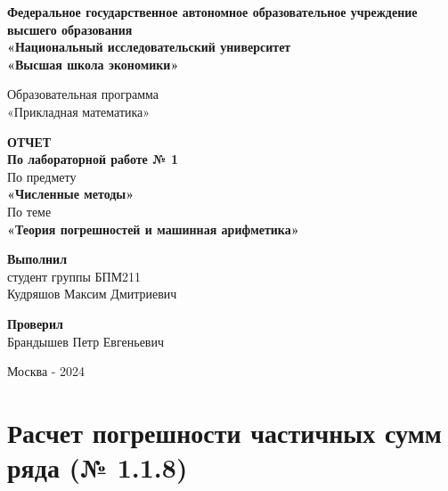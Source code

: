 \documentclass[a4paper,11pt]{article}
\theoremstyle{definition} %
\theoremstyle{remark} %
\begin{document}
\begin{titlepage} %
\pagestyle{empty}
\begin{center}

\Large
\textbf{Федеральное государственное автономное образовательное учреждение высшего образования\\
«Национальный исследовательский университет\\
«Высшая школа экономики»}\\
\vspace{5mm}

\Large
Образовательная программа \\
«Прикладная математика»
\vspace{40mm}

\Large
\textbf{ОТЧЕТ} \\
\textbf{По лабораторной работе № 1} \\
\vspace{5mm}
\Large По предмету \\
\LARGE\textbf{«Численные методы»} \\
\vspace{5mm}
\Large По теме \\
\LARGE\textbf{«Теория погрешностей и машинная арифметика»}
\end{center}

\begin{center}
\vfill

\large
\begin{flushright}
\textbf{Выполнил} \\
студент группы БПМ211 \\
Кудряшов Максим Дмитриевич \\
\end{flushright}

\large
\begin{flushright}
\textbf{Проверил} \\
Брандышев Петр Евгеньевич \\
\end{flushright}

\large
\vspace{20mm}
Москва - 2024
\end{center}
\end{titlepage} %

\newpage
\tableofcontents
\newpage

\section{Расчет погрешности частичных сумм ряда (№ 1.1.8)}
\end{document}

